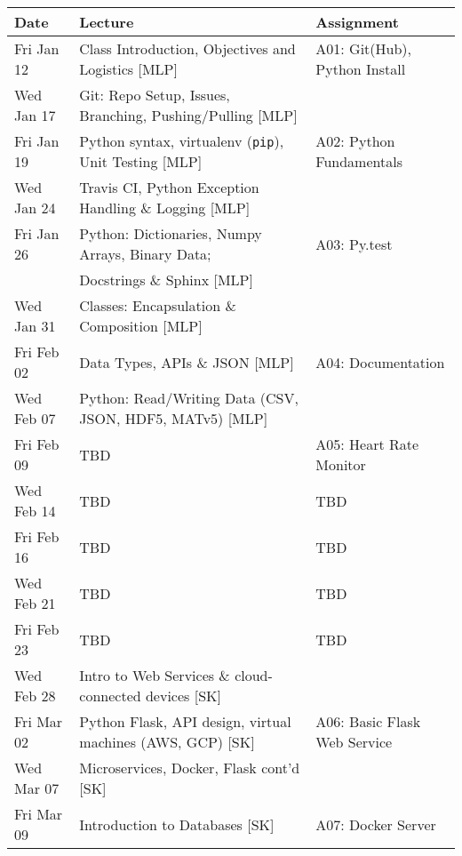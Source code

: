 \begin{longtable}[c]{|l|l|l|}

    \hline

    \textbf{Date} & \textbf{Lecture} & \textbf{Assignment}\\

    \hline

    Fri Jan 12     &
        Class Introduction, Objectives and Logistics [MLP] &
        A01: Git(Hub), Python Install\\
    \hline
    Wed Jan 17    &
        Git: Repo Setup, Issues, Branching, Pushing/Pulling [MLP] & \\
    Fri Jan 19     &
        Python syntax, virtualenv (\verb+pip+), Unit Testing [MLP] &
        A02: Python Fundamentals \\
    \hline
    Wed Jan 24     &
        Travis CI, Python Exception Handling \& Logging [MLP] & \\
    Fri Jan 26     &
        Python: Dictionaries, Numpy Arrays, Binary Data; &
        A03: Py.test \\
        &
        Docstrings \& Sphinx [MLP] & \\
    \hline
    Wed Jan 31    &
        Classes: Encapsulation \& Composition [MLP] & \\
    Fri Feb 02     &
        Data Types, APIs \& JSON [MLP] &
        A04: Documentation \\
    \hline
    Wed Feb 07    &
        Python: Read/Writing Data (CSV, JSON, HDF5, MATv5) [MLP] & \\
    Fri Feb 09     &
        TBD & A05: Heart Rate Monitor \\
    \hline
    Wed Feb 14     &
        TBD & TBD \\
    Fri Feb 16    &
        TBD & TBD \\
    \hline
    Wed Feb 21     &
        TBD & TBD \\
    Fri Feb 23    &
        TBD & TBD \\
    \hline
    Wed Feb 28      &
        Intro to Web Services \& cloud-connected devices [SK] & \\
    Fri Mar 02    &
        Python Flask, API design, virtual machines (AWS, GCP) [SK] &
        A06: Basic Flask Web Service \\
    \hline
    Wed Mar 07     &
        Microservices, Docker, Flask cont'd [SK] & \\
    Fri Mar 09    &
        Introduction to Databases [SK] &
        A07: Docker Server \\

\end{longtable}
